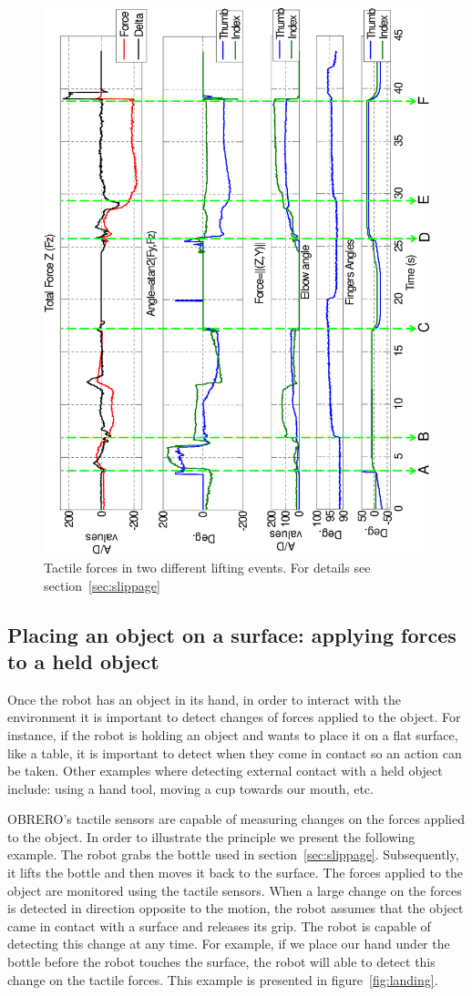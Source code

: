 \begin{figure}[htbp]
\centerline{
\includegraphics[height=\textwidth, angle=270 ]{./figures/ThesisSlipX.eps}
} \caption[Tactile forces when lifting an object]{Tactile forces
in two different lifting events. For details see
section~\ref{sec:slippage} } \label{fig:slip}
\end{figure}

\subsection{Placing an object on a surface: applying forces to a held object}

Once the robot has an object in its hand, in order to interact
with the environment it is important to detect changes of forces
applied to the object. For instance, if the robot is holding an
object and wants to place it on a flat surface, like a table, it
is important to detect when they come in contact so an action can
be taken. Other examples where detecting external contact with a
held object include: using a hand tool, moving a cup towards our
mouth, etc.

OBRERO's tactile sensors are capable of measuring changes on the
forces applied to the object. In order to illustrate the principle
we present the following example. The robot grabs the bottle used
in section~\ref{sec:slippage}. Subsequently, it lifts the bottle
and then moves it back to the surface. The forces applied to the
object are monitored using the tactile sensors. When a large
change on the forces is detected in direction opposite to the
motion, the robot assumes that the object came in contact with a
surface and releases its grip. The robot is capable of detecting
this change at any time. For example, if we place our hand under
the bottle before the robot touches the surface, the robot will
able to detect this change on the tactile forces. This example is
presented in figure~\ref{fig:landing}.


